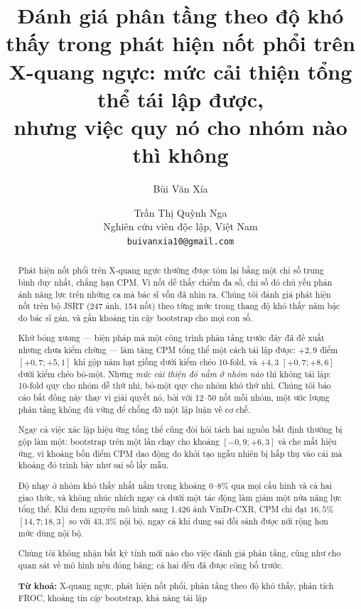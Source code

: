 \documentclass[12pt,a4paper]{article}
\title{\textbf{Đánh giá phân tầng theo độ khó thấy trong phát hiện nốt phổi
trên X-quang ngực: mức cải thiện tổng thể tái lập được,\\
nhưng việc quy nó cho nhóm nào thì không}}
\author{Bùi Văn Xía \and Trần Thị Quỳnh Nga \\[4pt]
\normalsize Nghiên cứu viên độc lập, Việt Nam \\
\normalsize \texttt{buivanxia10@gmail.com}}
\date{}
\begin{document}
\maketitle

\begin{abstract}
\noindent
Phát hiện nốt phổi trên X-quang ngực thường được tóm lại bằng một chỉ số trung
bình duy nhất, chẳng hạn CPM. Vì nốt dễ thấy chiếm đa số, chỉ số đó chủ yếu
phản ánh năng lực trên những ca mà bác sĩ vốn đã nhìn ra. Chúng tôi đánh giá
phát hiện nốt trên bộ JSRT (247 ảnh, 154 nốt) theo từng mức trong thang độ khó
thấy năm bậc do bác sĩ gán, và gắn khoảng tin cậy bootstrap cho mọi con số.

Khử bóng xương --- biện pháp mà một công trình phân tầng trước đây đã đề xuất
nhưng chưa kiểm chứng --- làm tăng CPM tổng thể một cách tái lập được:
$+2{,}9$ điểm $[+0{,}7; +5{,}1]$ khi gộp năm hạt giống dưới kiểm chéo 10-fold,
và $+4{,}3$ $[+0{,}7; +8{,}6]$ dưới kiểm chéo bỏ-một. Nhưng \emph{mức cải thiện
đó nằm ở nhóm nào} thì không tái lập: 10-fold quy cho nhóm dễ thứ nhì, bỏ-một
quy cho nhóm khó thứ nhì. Chúng tôi báo cáo bất đồng này thay vì giải quyết nó,
bởi với 12--50 nốt mỗi nhóm, một ước lượng phân tầng không đủ vững để chống đỡ
một lập luận về cơ chế.

Ngay cả việc xác lập hiệu ứng tổng thể cũng đòi hỏi tách hai nguồn bất định
thường bị gộp làm một: bootstrap trên một lần chạy cho khoảng $[-0{,}9; +6{,}3]$
và che mất hiệu ứng, vì khoảng bốn điểm CPM dao động do khởi tạo ngẫu nhiên bị
hấp thụ vào cái mà khoảng đó trình bày như sai số lấy mẫu.

Độ nhạy ở nhóm khó thấy nhất nằm trong khoảng 0--8\% qua mọi cấu hình và cả hai
giao thức, và không nhúc nhích ngay cả dưới một tác động làm giảm một nửa năng
lực tổng thể. Khi đem nguyên mô hình sang 1.426 ảnh VinDr-CXR, CPM chỉ đạt
$16{,}5\%$ $[14{,}7; 18{,}3]$ so với $43{,}3\%$ nội bộ, ngay cả khi dung sai
đối sánh được nới rộng hơn mức dùng nội bộ.

Chúng tôi không nhận bất kỳ tính mới nào cho việc đánh giá phân tầng, cũng như
cho quan sát về mô hình nền đóng băng; cả hai đều đã được công bố trước.

\medskip
\noindent\textbf{Từ khoá:} X-quang ngực, phát hiện nốt phổi, phân tầng theo độ
khó thấy, phân tích FROC, khoảng tin cậy bootstrap, khả năng tái lập
\end{abstract}

\end{document}
